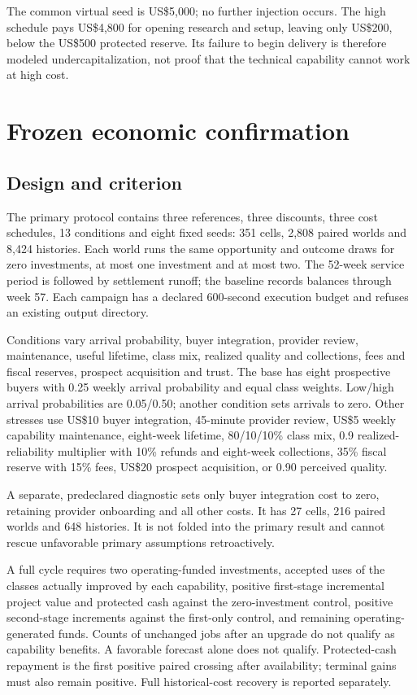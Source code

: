 \documentclass[11pt,letterpaper]{article}
\newcommand{\usd}[1]{US\$#1}
\begin{document}
The common virtual seed is \usd{5,000}; no further injection occurs. The high schedule pays \usd{4,800} for opening research and setup, leaving only \usd{200}, below the \usd{500} protected reserve. Its failure to begin delivery is therefore modeled undercapitalization, not proof that the technical capability cannot work at high cost.

\section{Frozen economic confirmation}
\subsection{Design and criterion}
The primary protocol contains three references, three discounts, three cost schedules, 13 conditions and eight fixed seeds: 351 cells, 2,808 paired worlds and 8,424 histories. Each world runs the same opportunity and outcome draws for zero investments, at most one investment and at most two. The 52-week service period is followed by settlement runoff; the baseline records balances through week 57. Each campaign has a declared 600-second execution budget and refuses an existing output directory.

Conditions vary arrival probability, buyer integration, provider review, maintenance, useful lifetime, class mix, realized quality and collections, fees and fiscal reserves, prospect acquisition and trust. The base has eight prospective buyers with 0.25 weekly arrival probability and equal class weights. Low/high arrival probabilities are 0.05/0.50; another condition sets arrivals to zero. Other stresses use \usd{10} buyer integration, 45-minute provider review, \usd{5} weekly capability maintenance, eight-week lifetime, 80/10/10\% class mix, 0.9 realized-reliability multiplier with 10\% refunds and eight-week collections, 35\% fiscal reserve with 15\% fees, \usd{20} prospect acquisition, or 0.90 perceived quality.

A separate, predeclared diagnostic sets only buyer integration cost to zero, retaining provider onboarding and all other costs. It has 27 cells, 216 paired worlds and 648 histories. It is not folded into the primary result and cannot rescue unfavorable primary assumptions retroactively.

A full cycle requires two operating-funded investments, accepted uses of the classes actually improved by each capability, positive first-stage incremental project value and protected cash against the zero-investment control, positive second-stage increments against the first-only control, and remaining operating-generated funds. Counts of unchanged jobs after an upgrade do not qualify as capability benefits. A favorable forecast alone does not qualify. Protected-cash repayment is the first positive paired crossing after availability; terminal gains must also remain positive. Full historical-cost recovery is reported separately.
\end{document}
